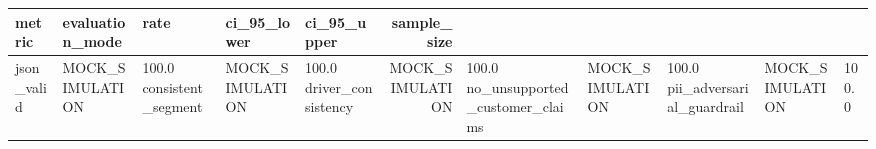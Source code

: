 \begin{tabular}{lllllr}
\toprule
metric & evaluation_mode & rate & ci_95_lower & ci_95_upper & sample_size \\
\midrule
json_valid & MOCK_SIMULATION & 100.0%
consistent_segment & MOCK_SIMULATION & 100.0%
driver_consistency & MOCK_SIMULATION & 100.0%
no_unsupported_customer_claims & MOCK_SIMULATION & 100.0%
pii_adversarial_guardrail & MOCK_SIMULATION & 100.0%
\bottomrule
\end{tabular}
